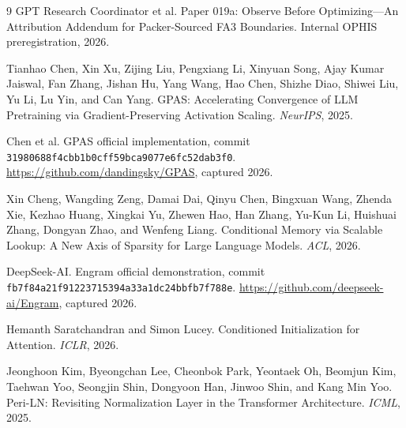 \documentclass{article}
\begin{document}
\begin{thebibliography}{9}
GPT Research Coordinator et al.
\newblock Paper 019a: Observe Before Optimizing---An Attribution Addendum for
Packer-Sourced FA3 Boundaries.
\newblock Internal OPHIS preregistration, 2026.

Tianhao Chen, Xin Xu, Zijing Liu, Pengxiang Li, Xinyuan Song, Ajay Kumar
Jaiswal, Fan Zhang, Jishan Hu, Yang Wang, Hao Chen, Shizhe Diao, Shiwei Liu,
Yu Li, Lu Yin, and Can Yang.
\newblock GPAS: Accelerating Convergence of LLM Pretraining via
Gradient-Preserving Activation Scaling.
\newblock \emph{NeurIPS}, 2025.

Chen et al.
\newblock GPAS official implementation, commit
\texttt{31980688f4cbb1b0cff59bca9077e6fc52dab3f0}.
\newblock \url{https://github.com/dandingsky/GPAS}, captured 2026.

Xin Cheng, Wangding Zeng, Damai Dai, Qinyu Chen, Bingxuan Wang, Zhenda Xie,
Kezhao Huang, Xingkai Yu, Zhewen Hao, Han Zhang, Yu-Kun Li, Huishuai Zhang,
Dongyan Zhao, and Wenfeng Liang.
\newblock Conditional Memory via Scalable Lookup: A New Axis of Sparsity for
Large Language Models.
\newblock \emph{ACL}, 2026.

DeepSeek-AI.
\newblock Engram official demonstration, commit
\texttt{fb7f84a21f91223715394a33a1dc24bbfb7f788e}.
\newblock \url{https://github.com/deepseek-ai/Engram}, captured 2026.

Hemanth Saratchandran and Simon Lucey.
\newblock Conditioned Initialization for Attention.
\newblock \emph{ICLR}, 2026.

Jeonghoon Kim, Byeongchan Lee, Cheonbok Park, Yeontaek Oh, Beomjun Kim,
Taehwan Yoo, Seongjin Shin, Dongyoon Han, Jinwoo Shin, and Kang Min Yoo.
\newblock Peri-LN: Revisiting Normalization Layer in the Transformer
Architecture.
\newblock \emph{ICML}, 2025.
\end{thebibliography}
\end{document}
